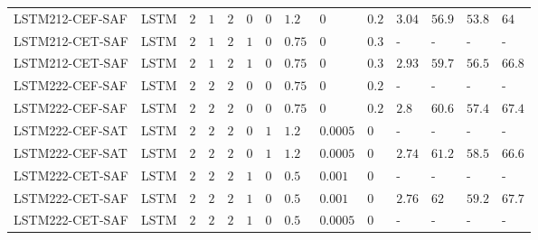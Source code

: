 \begin{table}[tbp]
\begin{tabular}{llllllllllllll}
LSTM212-CEF-SAF & LSTM & $2$ & $1$ & $2$ & $0$ & $0$ & $1.2$ & $0$ & $0.2$ & $3.04$ & $56.9$ & $53.8$ & $64$ \\
LSTM212-CET-SAF & LSTM & $2$ & $1$ & $2$ & $1$ & $0$ & $0.75$ & $0$ & $0.3$ & - & - & - & - \\
LSTM212-CET-SAF & LSTM & $2$ & $1$ & $2$ & $1$ & $0$ & $0.75$ & $0$ & $0.3$ & $2.93$ & $59.7$ & $56.5$ & $66.8$ \\
LSTM222-CEF-SAF & LSTM & $2$ & $2$ & $2$ & $0$ & $0$ & $0.75$ & $0$ & $0.2$ & - & - & - & - \\
LSTM222-CEF-SAF & LSTM & $2$ & $2$ & $2$ & $0$ & $0$ & $0.75$ & $0$ & $0.2$ & $2.8$ & $60.6$ & $57.4$ & $67.4$ \\
LSTM222-CEF-SAT & LSTM & $2$ & $2$ & $2$ & $0$ & $1$ & $1.2$ & $0.0005$ & $0$ & - & - & - & - \\
LSTM222-CEF-SAT & LSTM & $2$ & $2$ & $2$ & $0$ & $1$ & $1.2$ & $0.0005$ & $0$ & $2.74$ & $61.2$ & $58.5$ & $66.6$ \\
LSTM222-CET-SAF & LSTM & $2$ & $2$ & $2$ & $1$ & $0$ & $0.5$ & $0.001$ & $0$ & - & - & - & - \\
LSTM222-CET-SAF & LSTM & $2$ & $2$ & $2$ & $1$ & $0$ & $0.5$ & $0.001$ & $0$ & $2.76$ & $62$ & $59.2$ & $67.7$ \\
LSTM222-CET-SAF & LSTM & $2$ & $2$ & $2$ & $1$ & $0$ & $0.5$ & $0.0005$ & $0$ & - & - & - & - \\
\hline
\end{tabular}
\end{table}
